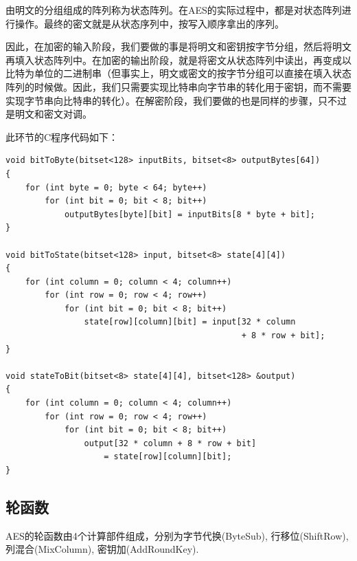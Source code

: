 由明文的分组组成的阵列称为状态阵列。在AES的实际过程中，都是对状态阵列进行操作。最终的密文就是从状态序列中，按写入顺序拿出的序列。\par
因此，在加密的输入阶段，我们要做的事是将明文和密钥按字节分组，然后将明文再填入状态阵列中。在加密的输出阶段，就是将密文从状态阵列中读出，再变成以比特为单位的二进制串（但事实上，明文或密文的按字节分组可以直接在填入状态阵列的时候做。因此，我们只需要实现比特串向字节串的转化用于密钥，而不需要实现字节串向比特串的转化）。在解密阶段，我们要做的也是同样的步骤，只不过是明文和密文对调。\par
此环节的C程序代码如下：
\begin{prove}
\begin{verbatim}
void bitToByte(bitset<128> inputBits, bitset<8> outputBytes[64])
{
    for (int byte = 0; byte < 64; byte++)
        for (int bit = 0; bit < 8; bit++)
            outputBytes[byte][bit] = inputBits[8 * byte + bit];
}

void bitToState(bitset<128> input, bitset<8> state[4][4])
{
    for (int column = 0; column < 4; column++)
        for (int row = 0; row < 4; row++)
            for (int bit = 0; bit < 8; bit++)
                state[row][column][bit] = input[32 * column
                                                + 8 * row + bit];
}

void stateToBit(bitset<8> state[4][4], bitset<128> &output)
{
    for (int column = 0; column < 4; column++)
        for (int row = 0; row < 4; row++)
            for (int bit = 0; bit < 8; bit++)
                output[32 * column + 8 * row + bit]
                    = state[row][column][bit];
}
\end{verbatim}
\end{prove}
\subsection{轮函数}
AES的轮函数由4个计算部件组成，分别为字节代换(ByteSub), 行移位(ShiftRow), 列混合(MixColumn), 密钥加(AddRoundKey).
